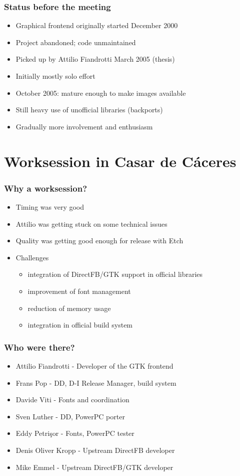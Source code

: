 \documentclass{beamer}
\begin{document}
\begin{frame}
  \frametitle{Status before the meeting}
	\begin{itemize}
	\item
		Graphical frontend originally started December 2000
	\item
		Project abandoned; code unmaintained
	\item
		Picked up by Attilio Fiandrotti March 2005 (thesis)
	\item
		Initially mostly solo effort
	\item
		October 2005: mature enough to make images available
	\item
		Still heavy use of unofficial libraries (backports)
	\item
		Gradually more involvement and enthusiasm
	\end{itemize}
\end{frame}

\section{Worksession in Casar de C\'{a}ceres}

\begin{frame}
  \frametitle{Why a worksession?}
	\begin{itemize}
	\item
		Timing was very good
	\item
		Attilio was getting stuck on some technical issues
	\item
		Quality was getting good enough for release with Etch
	\item
		Challenges
		\begin{itemize}
		\item
			integration of DirectFB/GTK support in official libraries
		\item
			improvement of font management
		\item
			reduction of memory usage
		\item
			integration in official build system
		\end{itemize}
	\end{itemize}
\end{frame}

\begin{frame}
  \frametitle{Who were there?}
	\begin{itemize}
	\item
		Attilio Fiandrotti - Developer of the GTK frontend
	\item
		Frans Pop - DD, D-I Release Manager, build system
	\item
		Davide Viti - Fonts and coordination
	\item
		Sven Luther - DD, PowerPC porter
	\item
		Eddy Petrişor - Fonts, PowerPC tester
	\end{itemize}
	\begin{itemize}
	\item
		Denis Oliver Kropp - Upstream DirectFB developer
	\item
		Mike Emmel - Upstream DirectFB/GTK developer
	\end{itemize}
\end{frame}
\end{document}
